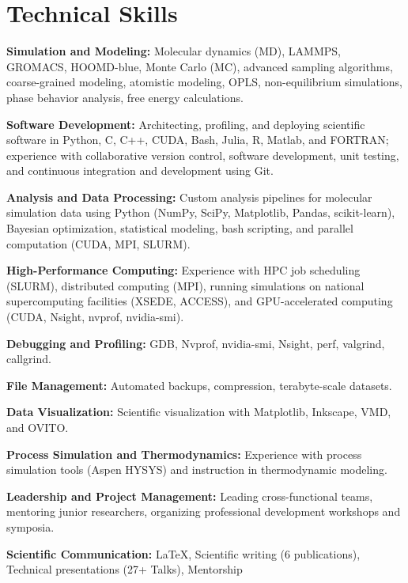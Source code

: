 \documentclass[letterpaper,12pt]{article}
\begin{document}
\vspace{-0.3\baselineskip}
\section*{Technical Skills}
\begin{tabitemize}[leftmargin=*]
    \item \textbf{Simulation and Modeling:} Molecular dynamics (MD), LAMMPS, GROMACS, HOOMD-blue, Monte Carlo (MC), advanced sampling algorithms, coarse-grained modeling, atomistic modeling, OPLS, non-equilibrium simulations, phase behavior analysis, free energy calculations.
    \item \textbf{Software Development:} Architecting, profiling, and deploying scientific software in Python, C, C++, CUDA, Bash, Julia, R, Matlab, and FORTRAN; experience with collaborative version control, software development, unit testing, and continuous integration and development using Git.
    \item \textbf{Analysis and Data Processing:} Custom analysis pipelines for molecular simulation data using Python (NumPy, SciPy, Matplotlib, Pandas, scikit-learn), Bayesian optimization, statistical modeling, bash scripting, and parallel computation (CUDA, MPI, SLURM).
    \item \textbf{High-Performance Computing:} Experience with HPC job scheduling (SLURM), distributed computing (MPI), running simulations on national supercomputing facilities (XSEDE, ACCESS), and GPU-accelerated computing (CUDA, Nsight, nvprof, nvidia-smi).
    \item \textbf{Debugging and Profiling:} GDB, Nvprof, nvidia-smi, Nsight, perf, valgrind, callgrind.
    \item \textbf{File Management:} Automated backups, compression, terabyte-scale datasets.
    \item \textbf{Data Visualization:} Scientific visualization with Matplotlib, Inkscape, VMD, and OVITO.
    \item \textbf{Process Simulation and Thermodynamics:} Experience with process simulation tools (Aspen HYSYS) and instruction in thermodynamic modeling.
    \item \textbf{Leadership and Project Management:} Leading cross-functional teams, mentoring junior researchers, organizing professional development workshops and symposia.
    \item \textbf{Scientific Communication:} LaTeX, Scientific writing (6 publications), Technical presentations (27+ Talks), Mentorship
\end{tabitemize}
\end{document}

